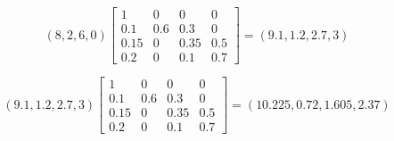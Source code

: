 \begin{frame}
$$
(8, 2, 6, 0)
\begin{bmatrix}
1 & 0 & 0 & 0\\
0.1  & 0.6 & 0.3  & 0\\
0.15 & 0   & 0.35 & 0.5\\
0.2  & 0   & 0.1  & 0.7
\end{bmatrix}
=
(9.1,1.2,2.7,3)
$$
	
$$
(9.1,1.2,2.7,3)
\begin{bmatrix}
1 & 0 & 0 & 0\\
0.1  & 0.6 & 0.3  & 0\\
0.15 & 0   & 0.35 & 0.5\\
0.2  & 0   & 0.1  & 0.7
\end{bmatrix}
=
(10.225,0.72,1.605,2.37)
$$
	
\end{frame}